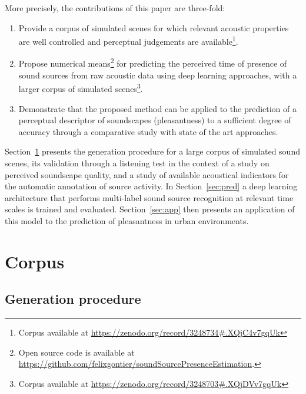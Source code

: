 \documentclass[twocolumn]{article}
\begin{document}
More precisely, the contributions of this paper are three-fold:
\begin{enumerate}
  \item Provide a corpus of simulated scenes for which relevant acoustic properties are well controlled and perceptual judgements are available\footnote{Corpus available at \url{https://zenodo.org/record/3248734\#.XQjC4v7gqUk}}.
  \item Propose numerical means\footnote{Open source code is available at \url{https://github.com/felixgontier/soundSourcePresenceEstimation}.} for predicting the perceived time of presence of sound sources from raw acoustic data using deep learning approaches, with a larger corpus of simulated scenes\footnote{Corpus available at \url{https://zenodo.org/record/3248703\#.XQjDVv7gqUk}}.
  \item Demonstrate that the proposed method can be applied to the prediction of a perceptual descriptor of soundscapes (pleasantness) to a sufficient degree of accuracy through a comparative study with state of the art approaches.
\end{enumerate}

Section~\ref{sec:data} presents the generation procedure for a large corpus of simulated sound scenes, its validation through a listening test in the context of a study on perceived soundscape quality, and a study of available acoustical indicators for the automatic annotation of source activity. In Section~\ref{sec:pred} a deep learning architecture that performs multi-label sound source recognition at relevant time scales is trained and evaluated. Section~\ref{sec:app} then presents an application of this model to the prediction of pleasantness in urban environments.

\section{Corpus}
\label{sec:data}


\subsection{Generation procedure}
\label{sec:data_corp}
\end{document}
